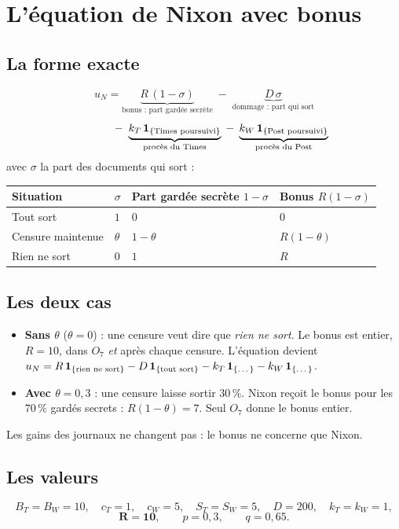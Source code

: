 \documentclass[11pt,a4paper]{article}
\theoremstyle{definition}
\newcommand{\ind}[1]{\mathbf{1}_{\{\text{#1}\}}}
\begin{document}
\section{L'équation de Nixon avec bonus}

\subsection{La forme exacte}
\[
u_N=\underbrace{R\,(1-\sigma)}_{\text{bonus : part gardée secrète}}\;-\;\underbrace{D\,\sigma}_{\text{dommage : part qui sort}}
\]
\[
\hphantom{u_N={}}\;-\;\underbrace{k_T\,\ind{Times poursuivi}}_{\text{procès du Times}}\;-\;\underbrace{k_W\,\ind{Post poursuivi}}_{\text{procès du Post}}
\]
avec $\sigma$ la part des documents qui sort :
\begin{center}
\small
\begin{tabular}{@{}llll@{}}
\toprule
Situation & $\sigma$ & Part gardée secrète $1-\sigma$ & Bonus $R(1-\sigma)$ \\
\midrule
Tout sort & $1$ & $0$ & $0$ \\
Censure maintenue & $\theta$ & $1-\theta$ & $R(1-\theta)$ \\
Rien ne sort & $0$ & $1$ & $R$ \\
\bottomrule
\end{tabular}
\end{center}

\subsection{Les deux cas}
\begin{itemize}[leftmargin=*,itemsep=2pt]
\item \textbf{Sans $\theta$} ($\theta=0$) : une censure veut dire que \emph{rien ne sort}. Le bonus est entier, $R=10$, dans $O_7$ \emph{et} après chaque censure. L'équation devient $u_N=R\,\ind{rien ne sort}-D\,\ind{tout sort}-k_T\,\ind{\dots}-k_W\,\ind{\dots}$.
\item \textbf{Avec $\theta=0,3$} : une censure laisse sortir $30\,\%$. Nixon reçoit le bonus pour les $70\,\%$ gardés secrets : $R(1-\theta)=7$. Seul $O_7$ donne le bonus entier.
\end{itemize}
Les gains des journaux ne changent pas : le bonus ne concerne que Nixon.

\subsection{Les valeurs}
\[
B_T=B_W=10,\quad c_T=1,\quad c_W=5,\quad S_T=S_W=5,\quad D=200,\quad k_T=k_W=1,
\]
\[
\mathbf{R=10},\qquad p=0,3,\qquad q=0,65 .
\]
\end{document}
